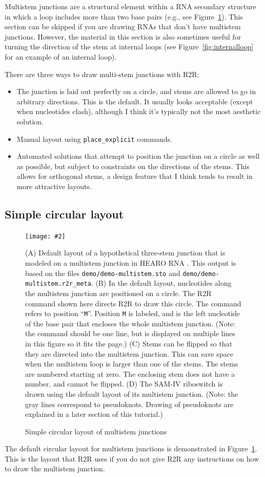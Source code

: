 \documentclass[letterpaper,12pt]{report}
\newcommand{\fig}[4]{
\begin{figure}
\texttt{[image: \#2]}
\caption{#3}

\begin{small}
#4
\end{small}
\label{#1}
\end{figure}
}
\begin{document}
Multistem junctions are a structural element within a RNA secondary structure in which a loop
includes more than two base pairs (e.g., see Figure~\ref{fig:multistemdefault}).
This section can be skipped if you are drawing RNAs that don't have multistem junctions.
However, the material in this section is also sometimes useful for turning the direction of the stem at internal loops (see Figure~\ref{fig:internalloop} for an example of an internal loop).

There are three ways to draw multi-stem junctions with R2R:
\begin{itemize}
\item The junction is laid out perfectly on a circle, and stems are allowed to go in arbitrary directions.
This is the default.  It usually looks acceptable (except when nucleotides clash), 
although I think it's typically not the most aesthetic solution.
\item Manual layout using {\tt place\_explicit} commands.
\item Automated solutions that attempt to position the junction on a circle as well as possible, but subject to
constraints on the directions of the stems.  This allows for orthogonal stems, a design feature that I think tends to result in more attractive layouts.
\end{itemize}

\subsection{Simple circular layout}
\label{sec:circlemultistem}
\fig{fig:multistemdefault}{figures/multistem-default.pdf}{Simple circular layout of multistem junctions}{
(A)
Default layout of a hypothetical three-stem junction that is modeled on a multistem junction in HEARO RNA \cite{CoolRNAs}.
This output is based on the files {\tt demo/demo-multistem.sto} and {\tt demo/demo-multistem.r2r\_meta}.
(B)
In the default layout, nucleotides along the multistem junction are positioned on a circle. The R2R command shown here directs R2R to draw this circle.
The command refers to position ``{\tt M}''. Position {\tt M} is labeled, and is the left nucleotide
of the base pair that encloses the whole multistem junction.
(Note: the command should be one line, but is displayed on multiple lines in this figure so it fits the page.)
(C)
Stems can be flipped so that they are directed into the multistem junction.
This can save space when the multistem loop is larger than one of the stems.
The stems are numbered starting at zero.  The enclosing stem does not have a number, and cannot be flipped.
(D)
The SAM-IV riboswitch \cite{SAMIV} is drawn using the default layout of its multistem junction.
(Note: the gray lines correspond to pseudoknots.  Drawing of pseudoknots are explained in a later section of this tutorial.)
}
The default circular layout for multistem junctions is demonstrated in Figure~\ref{fig:multistemdefault}.
This is the layout that R2R uses if you do not give R2R any instructions on how to draw the multistem junction.
\end{document}
